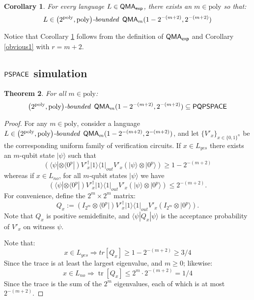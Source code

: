 \documentclass[11pt]{article}
\newtheorem{theorem}{Theorem}
\newtheorem{corollary}[theorem]{Corollary}
\theoremstyle{definition}
\theoremstyle{remark}
\newcommand\PSPACE{{\sf{PSPACE}}}
\newcommand\QMAexp{{\sf{QMA}_{exp}}}
\newcommand\bddQMA[5]{{\left(#1,#2\right)}\textit{-bounded }\QMA_{#3}(#4,#5)}
\newcommand\PQPSPACE{{\sf{PQPSPACE}}}
\newcommand{\ket}[1]{|#1\rangle}
\newcommand{\bra}[1]{\langle#1|}
\DeclareMathOperator{\tr}{tr}
\newcommand{\poly}{\textrm{poly}}
\begin{document}
\begin{corollary}\label{obvious2}For every language $L\in\QMAexp$, there exists an $m \in \poly$ so that:
\[L\in\bddQMA{2^{\poly}}{\poly}{m}{1-2^{-(m+2)}}{2^{-(m+2)}}\]
\end{corollary}
Notice that Corollary \ref{obvious2} follows from the definition of $\QMAexp$ and Corollary \ref{obvious1} with $r=m+2$.
\subsection{$\PSPACE$ simulation}
\begin{theorem}
For all $m\in\poly$:\[\bddQMA{2^{\poly}}{\poly}{m}{1-2^{-(m+2)}}{2^{-(m+2)}}\subseteq\PQPSPACE\]\end{theorem}
\begin{proof}
For any $m\in\poly$, consider a language $L\in\bddQMA{2^{\poly}}{\poly}{m}{1-2^{-(m+2)}}{2^{-(m+2)}}$, and let $\{V'_x\}_{x\in\{0,1\}^n}$ be the corresponding uniform family of verification circuits.
If $x\in L_{yes}$ there exists an $m$-qubit state $\ket{\psi}$ such that
\begin{equation}
\left(\bra{\psi}\otimes \bra{0^p}\right) V'^\dagger_x \ket{1}\bra{1}_{out} V'_x \left(\ket{\psi}\otimes \ket{0^p}\right) \ge 1-2^{-(m+2)}
\end{equation}
whereas if $x \in L_{no}$, for all $m$-qubit states $\ket{\psi}$ we have
\begin{equation}
\left(\bra{\psi}\otimes \bra{0^p}\right) V'^\dagger_x \ket{1}\bra{1}_{out} V'_x \left(\ket{\psi}\otimes \ket{0^p}\right) \le 2^{-(m+2)}.
\end{equation}
For convenience, define the $2^m \times 2^m$ matrix:
\begin{equation}
Q_x := \left(I_{2^m}\otimes \bra{0^p}\right) V'^\dagger_x \ket{1}\bra{1}_{out} V'_x \left(I_{2^m}\otimes \ket{0^p}\right).
\end{equation}
Note that $Q_x$ is positive semidefinite, and $\bra{\psi}Q_x\ket{\psi}$ is the acceptance probability of $V'_x$ on witness $\psi$.

Note that:     \[x\in L_{yes} \Rightarrow tr[Q_x]\ge 1 - 2^{-(m+2)} \ge 3/4\] Since the trace is at least the largest eigenvalue, and $m\geq 0$; likewise: \[x\in L_{no} \Rightarrow \tr[Q_x]\le 2^m \cdot 2^{-(m+2)} = 1/4\] Since the trace is the sum of the $2^m$ eigenvalues, each of which is at most $2^{-(m+2)}$. 


\end{proof}
\end{document}
